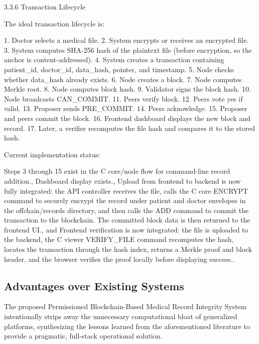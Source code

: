 \documentclass[12pt]{article}
\begin{document}
3.3.6 Transaction Lifecycle

The ideal transaction lifecycle is:

1. Doctor selects a medical file.
2. System encrypts or receives an encrypted file.
3. System computes SHA-256 hash of the plaintext file (before encryption, so the anchor is content-addressed).
4. System creates a transaction containing patient\_id, doctor\_id, data\_hash, pointer, and timestamp.
5. Node checks whether data\_hash already exists.
6. Node creates a block.
7. Node computes Merkle root.
8. Node computes block hash.
9. Validator signs the block hash.
10. Node broadcasts CAN\_COMMIT.
11. Peers verify block.
12. Peers vote yes if valid.
13. Proposer sends PRE\_COMMIT.
14. Peers acknowledge.
15. Proposer and peers commit the block.
16. Frontend dashboard displays the new block and record.
17. Later, a verifier recomputes the file hash and compares it to the stored hash.

Current implementation status:

 Steps 3 through 15 exist in the C core/node flow for command-line record addition., Dashboard display exists., Upload from frontend to backend is now fully integrated: the API controller receives the file, calls the C core ENCRYPT command to securely encrypt the record under patient and doctor envelopes in the offchain/records directory, and then calls the ADD command to commit the transaction to the blockchain. The committed block data is then returned to the frontend UI., and Frontend verification is now integrated: the file is uploaded to the backend, the C viewer VERIFY\_FILE command recomputes the hash, locates the transaction through the hash index, returns a Merkle proof and block header, and the browser verifies the proof locally before displaying success..

\subsection{Advantages over Existing Systems}

The proposed Permissioned Blockchain-Based Medical Record Integrity System intentionally strips away the unnecessary computational bloat of generalized platforms, synthesizing the lessons learned from the aforementioned literature to provide a pragmatic, full-stack operational solution.
\end{document}
